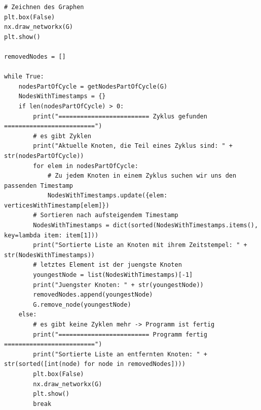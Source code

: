 \documentclass{article}
\begin{document}
\begin{lstlisting}[style=python, tabsize=2]
# Zeichnen des Graphen
plt.box(False)
nx.draw_networkx(G)
plt.show()

removedNodes = []

while True:
	nodesPartOfCycle = getNodesPartOfCycle(G)
	NodesWithTimestamps = {}
	if len(nodesPartOfCycle) > 0:
		print("========================= Zyklus gefunden =========================")
		# es gibt Zyklen
		print("Aktuelle Knoten, die Teil eines Zyklus sind: " + str(nodesPartOfCycle))
		for elem in nodesPartOfCycle:
			# Zu jedem Knoten in einem Zyklus suchen wir uns den passenden Timestamp
			NodesWithTimestamps.update({elem: verticesWithTimestamp[elem]})
		# Sortieren nach aufsteigendem Timestamp
		NodesWithTimestamps = dict(sorted(NodesWithTimestamps.items(), key=lambda item: item[1]))
		print("Sortierte Liste an Knoten mit ihrem Zeitstempel: " + str(NodesWithTimestamps))
		# letztes Element ist der juengste Knoten
		youngestNode = list(NodesWithTimestamps)[-1]
		print("Juengster Knoten: " + str(youngestNode))
		removedNodes.append(youngestNode)
		G.remove_node(youngestNode)
	else:
		# es gibt keine Zyklen mehr -> Programm ist fertig
		print("========================= Programm fertig =========================")
		print("Sortierte Liste an entfernten Knoten: " + str(sorted([int(node) for node in removedNodes])))
		plt.box(False)
		nx.draw_networkx(G)
		plt.show()
		break
	\end{lstlisting}
	
\end{document}
